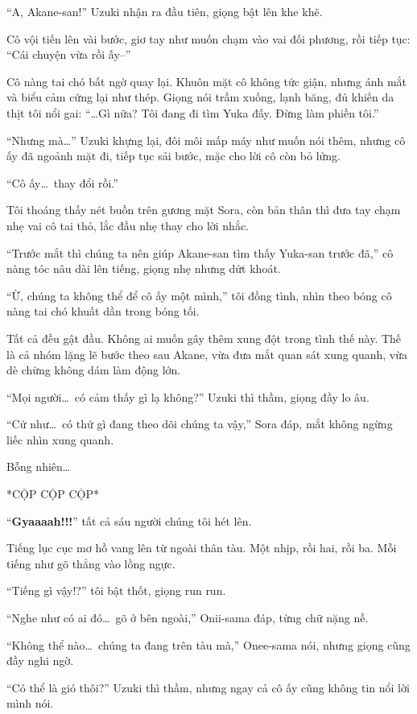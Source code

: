\documentclass[../main.tex]{subfiles}
\begin{document}
``A, Akane-san!'' Uzuki nhận ra đầu tiên, giọng bật lên khe khẽ.

Cô vội tiến lên vài bước, giơ tay như muốn chạm vào vai đối phương, rồi tiếp tục: ``Cái chuyện vừa rồi ấy--''

Cô nàng tai chó bất ngờ quay lại. Khuôn mặt cô không tức giận, nhưng ánh mắt và biểu cảm cứng lại như thép. Giọng nói trầm xuống, lạnh băng, đủ khiến da thịt tôi nổi gai: ``\dots Gì nữa? Tôi đang đi tìm Yuka đấy. Đừng làm phiền tôi.''


``Nhưng mà\dots'' Uzuki khựng lại, đôi môi mấp máy như muốn nói thêm, nhưng cô ấy đã ngoảnh mặt đi, tiếp tục sải bước, mặc cho lời cô còn bỏ lửng.

``Cô ấy\dots\ thay đổi rồi.''

Tôi thoáng thấy nét buồn trên gương mặt Sora, còn bản thân thì đưa tay chạm nhẹ vai cô tai thỏ, lắc đầu nhẹ thay cho lời nhắc.

``Trước mắt thì chúng ta nên giúp Akane-san tìm thấy Yuka-san trước đã,'' cô nàng tóc nâu dài lên tiếng, giọng nhẹ nhưng dứt khoát.

``Ừ, chúng ta không thể để cô ấy một mình,'' tôi đồng tình, nhìn theo bóng cô nàng tai chó khuất dần trong bóng tối.

Tất cả đều gật đầu. Không ai muốn gây thêm xung đột trong tình thế này. Thế là cả nhóm lặng lẽ bước theo sau Akane, vừa đưa mắt quan sát xung quanh, vừa dè chừng không dám làm động lớn.

``Mọi người\dots\ có cảm thấy gì lạ không?'' Uzuki thì thầm, giọng đầy lo âu.

``Cứ như\dots\ có thứ gì đang theo dõi chúng ta vậy,'' Sora đáp, mắt không ngừng liếc nhìn xung quanh.

Bỗng nhiên\dots

*CỘP CỘP CỘP*

``\textbf{Gyaaaah!!!}'' tất cả sáu người chúng tôi hét lên.


Tiếng lục cục mơ hồ vang lên từ ngoài thân tàu. Một nhịp, rồi hai, rồi ba. Mỗi tiếng như gõ thẳng vào lồng ngực.

``Tiếng gì vậy!?'' tôi bật thốt, giọng run run.

``Nghe như có ai đó\dots\ gõ ở bên ngoài,'' Onii-sama đáp, từng chữ nặng nề.

``Không thể nào\dots\ chúng ta đang trên tàu mà,'' Onee-sama nói, nhưng giọng cũng đầy nghi ngờ.

``Có thể là gió thôi?'' Uzuki thì thầm, nhưng ngay cả cô ấy cũng không tin nổi lời mình nói.
\end{document}

